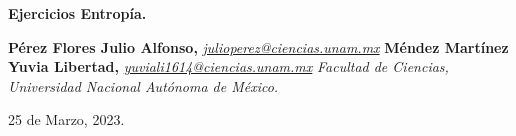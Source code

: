 \documentclass[a4paper,11pt]{extarticle} %
\begin{document}

\begin{center}

    \Large{\textbf{Ejercicios Entropía.}}



    \vspace{0.35em}

    \small{\textbf{ Pérez Flores Julio Alfonso,}
        \textit{\href{mailto:julio_ perez@ciencias.unam.mx}{julio\textunderscore perez@ciencias.unam.mx}}} \linebreak
    \small{\textbf{ Méndez Martínez Yuvia Libertad,}
        \textit{\href{mailto:yuviali1614@ciencias.unam.mx}{yuviali1614@ciencias.unam.mx}}} \linebreak
    \textit{\small{Facultad de Ciencias, Universidad Nacional Autónoma de México. }}

    \vspace{0.65em}

    \small{ 25 de Marzo, 2023.}

\end{center}
\end{document}
